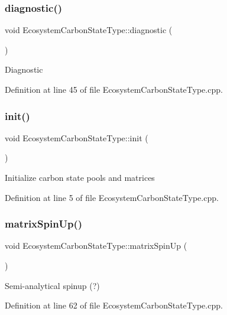 \subsubsection{\texorpdfstring{diagnostic()}{diagnostic()}}
{\footnotesize\ttfamily void Ecosystem\+Carbon\+State\+Type\+::diagnostic (\begin{DoxyParamCaption}{ }\end{DoxyParamCaption})}

Diagnostic 

Definition at line 45 of file Ecosystem\+Carbon\+State\+Type.\+cpp.

\mbox{\label{class_ecosystem_carbon_state_type_af8446f966b95c51b061ac5199bd8bc26}} 
\subsubsection{\texorpdfstring{init()}{init()}}
{\footnotesize\ttfamily void Ecosystem\+Carbon\+State\+Type\+::init (\begin{DoxyParamCaption}{ }\end{DoxyParamCaption})}

Initialize carbon state pools and matrices 

Definition at line 5 of file Ecosystem\+Carbon\+State\+Type.\+cpp.

\mbox{\label{class_ecosystem_carbon_state_type_a9ea22da7d71c04e00dff17a4f225855a}} 
\subsubsection{\texorpdfstring{matrix\+Spin\+Up()}{matrixSpinUp()}}
{\footnotesize\ttfamily void Ecosystem\+Carbon\+State\+Type\+::matrix\+Spin\+Up (\begin{DoxyParamCaption}{ }\end{DoxyParamCaption})}

Semi-\/analytical spinup (?) 

Definition at line 62 of file Ecosystem\+Carbon\+State\+Type.\+cpp.

